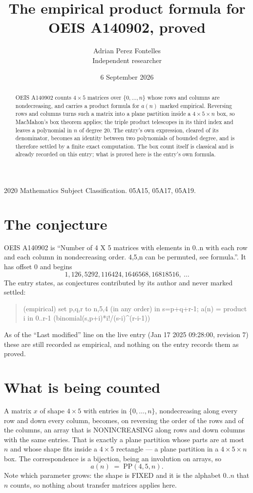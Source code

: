 \documentclass[11pt,a4paper]{article}
\title{The empirical product formula for OEIS A140902, proved}
\author{Adrian Perez Fontelles\\ \small Independent researcher}
\date{6 September 2026}
\theoremstyle{plain}
\theoremstyle{definition}
\begin{document}
\maketitle

\begin{abstract}
OEIS A140902 counts $4\times5$ matrices over $\{0,\dots,n\}$ whose rows and columns are
nondecreasing, and carries a product formula for $a(n)$ marked empirical. Reversing rows and
columns turns such a matrix into a plane partition inside a $4\times5\times n$ box, so
MacMahon's box theorem applies; the triple product telescopes in its third index and leaves a
polynomial in $n$ of degree $20$. The entry's own expression, cleared of its denominator,
becomes an identity between two polynomials of bounded degree, and is therefore settled by a
finite exact computation. The box count itself is classical and is already recorded on this
entry; what is proved here is the entry's own formula.
\end{abstract}

\noindent\small 2020 Mathematics Subject Classification. 05A15, 05A17, 05A19.\normalsize

\section{The conjecture}

OEIS A140902 is ``Number of 4 X 5 matrices with elements in 0..n with each row and each column in nondecreasing order. 4,5,n can be permuted, see formula.''. It has offset $0$ and begins
\[
1, 126, 5292, 116424, 1646568, 16818516,\ \dots
\]
The entry states, as conjectures contributed by its author and never marked settled:
\begin{quote}
(empirical) set p,q,r to n,5,4 (in any order) in s=p+q+r-1; a(n) = product {i in 0..r-1} (binomial(s,p+i)*i!/(s-i)\^{}(r-i-1))

\end{quote}
As of the ``Last modified'' line on the live entry (Jan 17 2025 09:28:00, revision 7) these are still
recorded as empirical, and nothing on the entry records them as proved.

\section{What is being counted}

A matrix $x$ of shape $4\times5$ with entries in $\{0,\dots,n\}$, nondecreasing along
every row and down every column, becomes, on reversing the order of the rows and of the
columns, an array that is NONINCREASING along rows and down columns with the same entries. That
is exactly a plane partition whose parts are at most $n$ and whose shape fits inside a
$4\times5$ rectangle --- a plane partition in a $4\times5\times n$ box. The
correspondence is a bijection, being an involution on arrays, so
\[
a(n)\;=\;\mathrm{PP}(4,5,n).
\]
Note which parameter grows: the shape is FIXED and it is the alphabet $0..n$ that $n$ counts,
so nothing about transfer matrices applies here.
\end{document}
